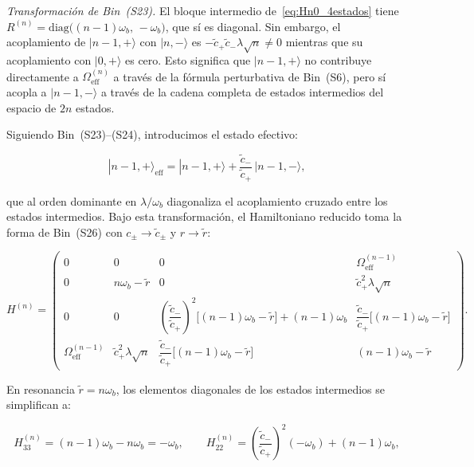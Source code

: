 \documentclass[12pt]{article}
\begin{document}
\medskip
\noindent
\textit{Transformación de Bin~(S23).}
El bloque intermedio de~\eqref{eq:Hn0_4estados} tiene
$R^{(n)} = \mathrm{diag}\bigl((n-1)\omega_b,\,-\omega_b\bigr)$,
que sí es diagonal. Sin embargo, el acoplamiento de $|n-1,{+}\rangle$
con $|n,{-}\rangle$ es $-\tilde{c}_+\tilde{c}_-\lambda\sqrt{n} \neq 0$
mientras que su acoplamiento con $|0,{+}\rangle$ es cero. Esto
significa que $|n-1,{+}\rangle$ no contribuye directamente a
$\Omega_\mathrm{eff}^{(n)}$ a través de la fórmula perturbativa
de Bin~(S6), pero sí acopla a $|n-1,{-}\rangle$ a través de
la cadena completa de estados intermedios del espacio de $2n$ estados.

Siguiendo Bin~(S23)--(S24), introducimos el estado efectivo:

\begin{equation}
	|n-1,{+}\rangle_\mathrm{eff}
	= |n-1,{+}\rangle
	+ \frac{\tilde{c}_-}{\tilde{c}_+}\,|n-1,{-}\rangle,
	\label{eq:estado_eff}
\end{equation}

que al orden dominante en $\lambda/\omega_b$ diagonaliza el acoplamiento
cruzado entre los estados intermedios. Bajo esta transformación,
el Hamiltoniano reducido toma la forma de Bin~(S26) con
$c_\pm \to \tilde{c}_\pm$ y $r \to \tilde{r}$:

\begin{equation}
	H^{(n)} = \begin{pmatrix}
		0 & 0 & 0 & \Omega_\mathrm{eff}^{(n-1)} \\[4pt]
		0 & n\omega_b-\tilde{r} & 0 & \tilde{c}_+^2\lambda\sqrt{n} \\[4pt]
		0 & 0 &
		\left(\dfrac{\tilde{c}_-}{\tilde{c}_+}\right)^{\!2}
		\!\!\bigl[(n-1)\omega_b-\tilde{r}\bigr]+(n-1)\omega_b &
		\dfrac{\tilde{c}_-}{\tilde{c}_+}\bigl[(n-1)\omega_b-\tilde{r}\bigr] \\[10pt]
		\Omega_\mathrm{eff}^{(n-1)} & \tilde{c}_+^2\lambda\sqrt{n} &
		\dfrac{\tilde{c}_-}{\tilde{c}_+}\bigl[(n-1)\omega_b-\tilde{r}\bigr] &
		(n-1)\omega_b-\tilde{r}
	\end{pmatrix}.
	\label{eq:Hn_S26}
\end{equation}

\noindent
En resonancia $\tilde{r} = n\omega_b$, los elementos diagonales
de los estados intermedios se simplifican a:

\begin{equation}
	H^{(n)}_{33} = (n-1)\omega_b - n\omega_b = -\omega_b,
	\qquad
	H^{(n)}_{22} =
	\left(\frac{\tilde{c}_-}{\tilde{c}_+}\right)^{\!2}(-\omega_b)
	+ (n-1)\omega_b,
	\label{eq:diag_intermedios}
\end{equation}
\end{document}
